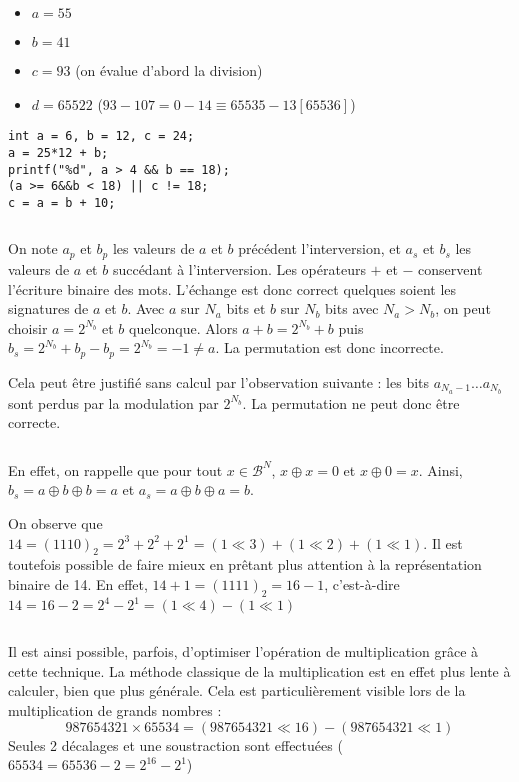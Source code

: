 \documentclass[../main.tex]{subfiles}
\begin{document}
\begin{itemize}
	\item $a = 55$
	\item $b = 41$
	\item $c = 93$ (on évalue d'abord la division)
	\item $d = 65522$ ($93 - 107 = 0 - 14 \equiv 65535 - 13 [65536]$)
\end{itemize}
\begin{verbatim}
int a = 6, b = 12, c = 24;
a = 25*12 + b;
printf("%d", a > 4 && b == 18);
(a >= 6&&b < 18) || c != 18;
c = a = b + 10;
\end{verbatim}
\inputminted{c}{solutions/part2/chapter2/inter_no_side_effect_1.c}
On note $a_{p}$ et $b_{p}$ les valeurs de $a$ et $b$ précédent l'interversion, et $a_{s}$ et $b_{s}$ les valeurs de $a$ et $b$ succédant à l'interversion.  
Les opérateurs $+$ et $-$ conservent l'écriture binaire des mots. L'échange est donc correct quelques soient les signatures de $a$ et $b$. 
Avec $a$ sur $N_{a}$ bits et $b$ sur $N_{b}$ bits avec $N_{a} > N_{b}$, on peut choisir $a = 2^{N_{b}}$ et $b$ quelconque. Alors $a + b = 2^{N_{b}}+b$ puis $b_{s} = 2^{N_{b}}+b_{p} - b_{p} = 2^{N_{b}} = -1 \neq{a}$. La permutation est donc incorrecte.
 
Cela peut être justifié sans calcul par l'observation suivante : les bits $a_{N_{a}-1}\dots a_{N_b}$ sont perdus par la modulation par $2^{N_{b}}$. La permutation ne peut donc être correcte.
 
\inputminted{c}{solutions/part2/chapter2/inter_no_side_effect_2.c}
En effet, on rappelle que pour tout ${x\in{\mathcal{B}^{N}}}$, $x\oplus{x} = 0$ et $x\oplus{0} = x$. Ainsi, $b_{s} = a\oplus{b}\oplus{b} = a$ et $a_{s} = a\oplus{b}\oplus{a} = b$.
 
 On observe que $14 = (1110)_{2} = 2^{3} + 2^{2} + 2^{1} = (1 \ll 3) + (1 \ll 2) + (1 \ll 1)$. Il est toutefois possible de faire mieux en prêtant plus attention à la représentation binaire de 14. En effet, $14 + 1 = (1111)_{2} = 16 - 1$, c'est-à-dire $14 = 16 - 2 = 2^{4} - 2^{1} = (1 \ll 4) - (1 \ll 1)$
\inputminted{c}{solutions/part2/chapter2/mult_decalage.c}
Il est ainsi possible, parfois, d'optimiser l'opération de multiplication grâce à cette technique. La méthode classique de la multiplication est en effet plus lente à calculer, bien que plus générale. Cela est particulièrement visible lors de la multiplication de grands nombres :
$$987654321\times{65534} = (987654321 \ll 16) - (987654321 \ll 1)$$
Seules 2 décalages et une soustraction sont effectuées ($65534 = 65536 - 2 = 2^{16} - 2^{1}$)
 
\end{document}
